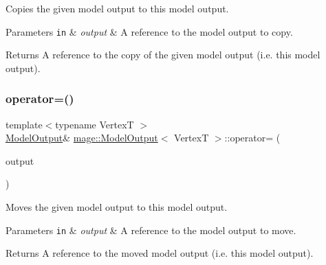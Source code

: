 Copies the given model output to this model output.


\begin{DoxyParams}[1]{Parameters}
\mbox{\tt in}  & {\em output} & A reference to the model output to copy. \\
\hline
\end{DoxyParams}
\begin{DoxyReturn}{Returns}
A reference to the copy of the given model output (i.\+e. this model output). 
\end{DoxyReturn}
\hypertarget{structmage_1_1_model_output_af8389323467cebe3bacbb66319a41403}{}\label{structmage_1_1_model_output_af8389323467cebe3bacbb66319a41403} 
\subsubsection{\texorpdfstring{operator=()}{operator=()}\hspace{0.1cm}{\footnotesize\ttfamily [2/2]}}
{\footnotesize\ttfamily template$<$typename VertexT $>$ \\
\hyperlink{structmage_1_1_model_output}{Model\+Output}\& \hyperlink{structmage_1_1_model_output}{mage\+::\+Model\+Output}$<$ VertexT $>$\+::operator= (\begin{DoxyParamCaption}\item[{\hyperlink{structmage_1_1_model_output}{Model\+Output}$<$ VertexT $>$ \&\&}]{output }\end{DoxyParamCaption})\hspace{0.3cm}{\ttfamily [delete]}}

Moves the given model output to this model output.


\begin{DoxyParams}[1]{Parameters}
\mbox{\tt in}  & {\em output} & A reference to the model output to move. \\
\hline
\end{DoxyParams}
\begin{DoxyReturn}{Returns}
A reference to the moved model output (i.\+e. this model output). 
\end{DoxyReturn}
\hypertarget{structmage_1_1_model_output_a26836ecfea7e7f78cc1c1e37da915230}{}\label{structmage_1_1_model_output_a26836ecfea7e7f78cc1c1e37da915230} 
